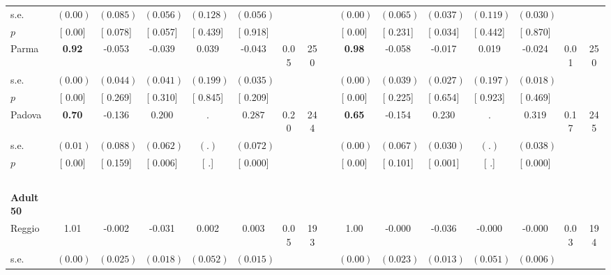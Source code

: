 \begin{longtable}{L{8em} c c c c c c c p{1em} c c c c c c c}
\quad \quad \quad \quad s.e.& $ (     0.00)$ & $ (    0.085)$ & $ (    0.056)$ & $ (    0.128)$ & $ (    0.056)$ & & & & $ (     0.00)$ & $ (    0.065)$ & $ (    0.037)$ & $ (    0.119)$ & $ (    0.030)$ & &  \\*
\quad \quad \quad \quad $ p$ & [     0.00] & [    0.078] & [    0.057] & [    0.439] & [    0.918] & & & & [     0.00] & [    0.231] & [    0.034] & [    0.442] & [    0.870] & &  \\[1em]
\quad \quad \quad Parma& \textbf{     0.92} &    -0.053 &    -0.039 &     0.039 &    -0.043 &      0.05 &       250 & & \textbf{     0.98} &    -0.058 &    -0.017 &     0.019 &    -0.024 &      0.01 &       250  \\*
\quad \quad \quad \quad s.e.& $ (     0.00)$ & $ (    0.044)$ & $ (    0.041)$ & $ (    0.199)$ & $ (    0.035)$ & & & & $ (     0.00)$ & $ (    0.039)$ & $ (    0.027)$ & $ (    0.197)$ & $ (    0.018)$ & &  \\*
\quad \quad \quad \quad $ p$ & [     0.00] & [    0.269] & [    0.310] & [    0.845] & [    0.209] & & & & [     0.00] & [    0.225] & [    0.654] & [    0.923] & [    0.469] & &  \\[1em]
\quad \quad \quad Padova& \textbf{     0.70} &    -0.136 & $ \mathbf{    0.200}$ &         . & $ \mathbf{    0.287}$ &      0.20 &       244 & & \textbf{     0.65} &    -0.154 & $ \mathbf{    0.230}$ &         . & $ \mathbf{    0.319}$ &      0.17 &       245  \\*
\quad \quad \quad \quad s.e.& $ (     0.01)$ & $ (    0.088)$ & $ (    0.062)$ & $ (        .)$ & $ (    0.072)$ & & & & $ (     0.00)$ & $ (    0.067)$ & $ (    0.030)$ & $ (        .)$ & $ (    0.038)$ & &  \\*
\quad \quad \quad \quad $ p$ & [     0.00] & [    0.159] & [    0.006] & [        .] & [    0.000] & & & & [     0.00] & [    0.101] & [    0.001] & [        .] & [    0.000] & &  \\[1em]
~\\[1em]
\quad \quad \textbf{Adult 50} & & & & & & & & & & & & & & & \\* 
\quad \quad \quad Reggio& 1.01 &    -0.002 &    -0.031 &     0.002 &     0.003 &      0.05 &       193 & & 1.00 &    -0.000 &    -0.036 &    -0.000 &    -0.000 &      0.03 &       194  \\*
\quad \quad \quad \quad s.e.& $ (     0.00)$ & $ (    0.025)$ & $ (    0.018)$ & $ (    0.052)$ & $ (    0.015)$ & & & & $ (     0.00)$ & $ (    0.023)$ & $ (    0.013)$ & $ (    0.051)$ & $ (    0.006)$ & &  \\*

\end{longtable}
